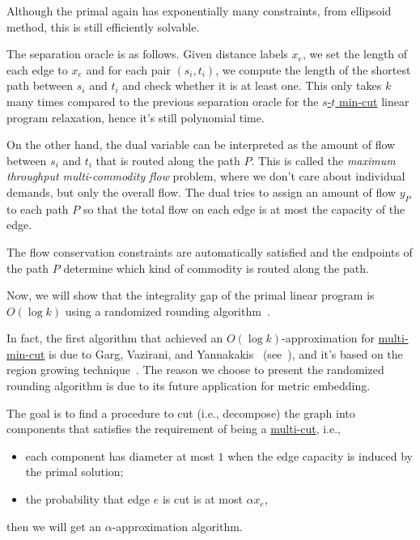 \begin{remark}
	Although the primal again has exponentially many constraints, from ellipsoid method, this is still efficiently solvable.
\end{remark}
\begin{explanation}
	The separation oracle is as follows. Given distance labels \(x_e\), we set the length of each edge to \(x_e\) and for each pair \((s_i, t_i)\), we compute the length of the shortest path between \(s_i\) and \(t_i\) and check whether it is at least one. This only takes \(k\) many times compared to the previous separation oracle for the \hyperref[prb:s-t-min-cut]{\(s\)-\(t\) min-cut} linear program relaxation, hence it's still polynomial time.
\end{explanation}

On the other hand, the dual variable can be interpreted as the amount of flow between \(s_i\) and \(t_i\) that is routed along the path \(P\). This is called the \emph{maximum throughput multi-commodity flow} problem, where we don't care about individual demands, but only the overall flow. The dual tries to assign an amount of flow \(y_P\) to each path \(P\) so that the total flow on each edge is at most the capacity of the edge.

\begin{note}
	The flow conservation constraints are automatically satisfied and the endpoints of the path \(P\) determine which kind of commodity is routed along the path.
\end{note}

Now, we will show that the integrality gap of the primal linear program is \(O(\log k)\) using a randomized rounding algorithm~\cite{calinescu2005approximation}.

\begin{note}
	In fact, the first algorithm that achieved an \(O(\log k)\)-approximation for \hyperref[prb:multi-min-cut]{multi-min-cut} is due to Garg, Vazirani, and Yannakakis~\cite{garg1993approximate} (see~\cite{vazirani2001approximation,williamson2011design}), and it's based on the region growing technique~\cite{leighton1999multicommodity}. The reason we choose to present the randomized rounding algorithm is due to its future application for metric embedding.
\end{note}

The goal is to find a procedure to cut (i.e., decompose) the graph into components that satisfies the requirement of being a \hyperref[prb:multi-min-cut]{multi-cut}, i.e.,
\begin{itemize}
	\item each component has diameter at most \(1\) when the edge capacity is induced by the primal solution;
	\item the probability that edge \(e\) is cut is at most \(\alpha x_e\),
\end{itemize}
then we will get an \(\alpha \)-approximation algorithm.

